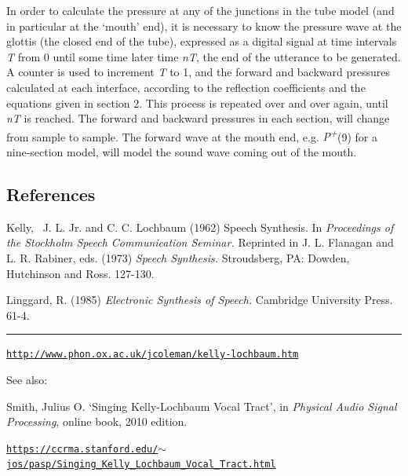 In order to calculate the pressure at any of the junctions in the tube model (and in particular at the `mouth' end), it is necessary to know the pressure wave at the glottis (the closed end of the tube), expressed as a digital signal at time intervals \textit{T} from 0 until some time later time \textit{nT}, the end of the utterance to be generated. A counter is used to increment \textit{T} to 1, and the forward and backward pressures calculated at each interface, according to the reflection coefficients and the equations given in section 2. This process is repeated over and over again, until \textit{nT} is reached. The forward and backward pressures in each section, will change from sample to sample. The forward wave at the mouth end, e.g. \textit{P\textsuperscript{+}}(9) for a nine-section model, will model the sound wave coming out of the mouth.

\bigskip

\subsection*{References}

\noindent Kelly,~ J. L. Jr. and C. C. Lochbaum (1962) Speech Synthesis. In \textit{Proceedings of the Stockholm Speech Communication Seminar.} Reprinted in J. L. Flanagan and L. R. Rabiner, eds. (1973) \textit{Speech Synthesis.} Stroudsberg, PA: Dowden, Hutchinson and Ross. 127-130.

\bigskip

\noindent Linggard, R. (1985) \textit{Electronic Synthesis of Speech.} Cambridge University Press. 61-4.

\begin{center}\rule{0.5\linewidth}{0.5pt}\end{center}

 \href{http://www.phon.ox.ac.uk/jcoleman/kelly-lochbaum.htm}{\texttt{\footnotesize http://www.phon.ox.ac.uk/jcoleman/kelly-lochbaum.htm}}

\bigskip

See also:

\noindent Smith, Julius O. `Singing Kelly-Lochbaum Vocal Tract', in \textit{Physical Audio Signal Processing}, online book, 2010 edition.

\noindent \href{https://ccrma.stanford.edu/~jos/pasp/Singing\_Kelly\_Lochbaum\_Vocal\_Tract.html}{\texttt{\footnotesize https://ccrma.stanford.edu/$\sim$jos/pasp/Singing\_Kelly\_Lochbaum\_Vocal\_Tract.html}}
